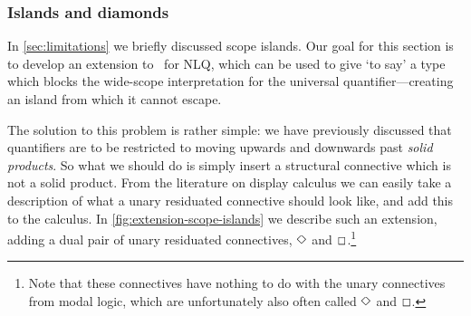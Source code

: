\subsubsection{Islands and diamonds}
\label{sec:scope-islands}
In \autoref{sec:limitations} we briefly discussed scope islands. Our
goal for this section is to develop an extension to \I\B\C\ for NLQ,
which can be used to give `to say' a type which blocks the wide-scope
interpretation for the universal quantifier---creating an island from
which it cannot escape.

The solution to this problem is rather simple: we have previously
discussed that quantifiers are to be restricted to moving upwards and
downwards past \emph{solid products}. So what we should do is simply
insert a structural connective which is not a solid product.
From the literature on display calculus we can easily take a
description of what a unary residuated connective should look like,
and add this to the calculus. In \autoref{fig:extension-scope-islands}
we describe such an extension, adding a dual pair of unary residuated
connectives, $\Diamond$ and $\Box$.\footnote{%
  Note that these connectives have nothing to do with the unary
  connectives from modal logic, which are unfortunately also often
  called $\Diamond$ and $\Box$.
}



